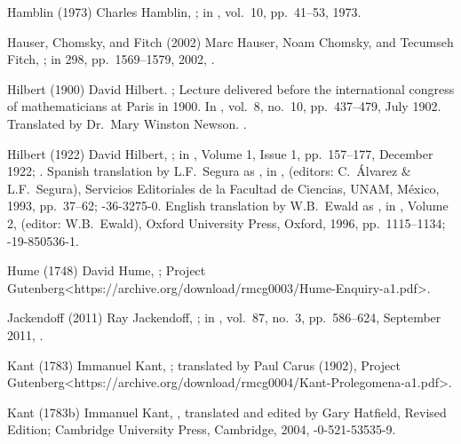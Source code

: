 \biblabel Hamblin (1973)
Charles Hamblin,
;
in ,
vol.\ 10, pp.\ 41--53, 1973.

\biblabel Hauser, Chomsky, and Fitch (2002)
Marc Hauser, Noam Chomsky, and Tecumseh Fitch,
;
in  298, pp.\ 1569--1579, 2002,
.

\biblabel Hilbert (1900)
David Hilbert.
;
Lecture delivered before the international
congress of mathematicians at Paris in 1900.
In ,
vol.\ 8, no.\ 10, pp.\ 437--479, July 1902.
Translated by Dr.\ Mary Winston Newson.
.

\biblabel Hilbert (1922)
David Hilbert,
;
in ,
Volume 1, Issue 1, pp.~157--177, December 1922;
.
Spanish translation by L.F.\ Segura as
,
in ,
 (editors: C.\ Álvarez \& L.F.\ Segura),
Servicios Editoriales de la Facultad de Ciencias, UNAM,
México, 1993, pp.~37--62;
-36-3275-0.
English translation by W.B.\ Ewald as
,
in , Volume 2,
 (editor: W.B.\ Ewald),
Oxford University Press, Oxford, 1996, pp.~1115--1134;
-19-850536-1.

\biblabel Hume (1748)
David Hume,
;
\URL Project Gutenberg<https://archive.org/download/rmcg0003/Hume-Enquiry-a1.pdf>.

\biblabel Jackendoff (2011)
Ray Jackendoff,
;
in ,
vol.\ 87, no.\ 3, pp.\ 586--624, September 2011,
.

\biblabel Kant (1783)
Immanuel Kant,
;
translated by Paul Carus (1902),
\URL Project Gutenberg<https://archive.org/download/rmcg0004/Kant-Prolegomena-a1.pdf>.

\biblabel Kant (1783b)
Immanuel Kant,
,
translated and edited by Gary Hatfield, Revised Edition;
Cambridge University Press, Cambridge, 2004,
-0-521-53535-9.

